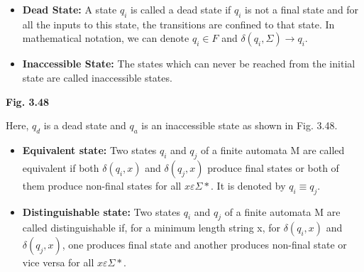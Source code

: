 \documentclass[a4,9pt]{beamer}
\begin{document}
\begin{frame}
\begin{itemize}
  \item \textbf{Dead State:} A state $q_i$ is called a dead state if $q_i$ is not a final state and for all the inputs to this
state, the transitions are confined to that state. In mathematical notation, we can denote $q_i \in  F$ and
$\delta(q_i, \Sigma) \rightarrow q_i$.
  \item \textbf{Inaccessible State:} The states which can never be reached from the initial state are called inaccessible
states.
\end{itemize}

\pause
\begin{center}
\end{center}
\begin{center}
\textbf{Fig. 3.48}
\end{center}

Here, $q_d$ is a dead state and $q_a$ is an inaccessible state as shown in Fig. 3.48.
\end{frame}

\begin{frame}
\begin{itemize}
  \item \textbf{Equivalent state:} Two states $q_i$ and $q_j$ of a finite automata M are called equivalent if both $\delta(q_i, x)$ and
$\delta(q_j, x)$ produce final states or both of them produce non-final states for all $x \varepsilon \Sigma*$. It is denoted by $q_i \equiv q_j$.
  \item \textbf{Distinguishable state:} Two states $q_i$ and $q_j$ of a finite automata M are called distinguishable if, for
a minimum length string x, for $\delta(q_i, x)$ and $\delta(q_j, x)$, one produces final state and another produces
non-final state or vice versa for all $x \varepsilon \Sigma*$.
\end{itemize}
\end{frame}
\end{document}
